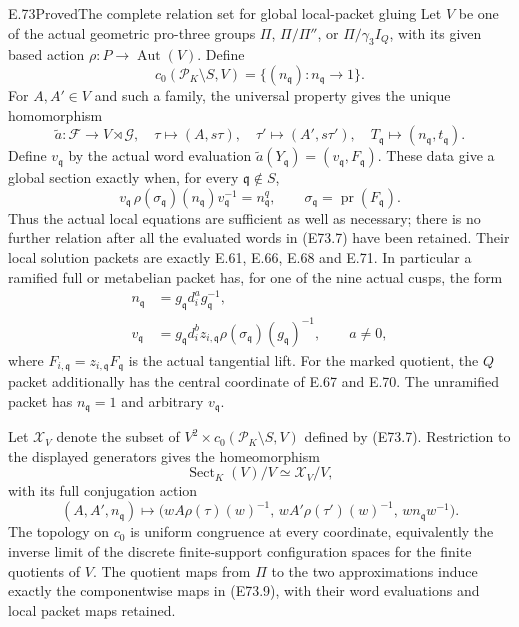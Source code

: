 \begin{statement}{E.73}{Proved}{The complete relation set for global local-packet gluing}
Let $V$ be one of the actual geometric pro-three groups
$\Pi$, $\Pi/\Pi''$, or $\Pi/\gamma_3 I_Q$, with its given
based action $\rho:P\to\operatorname{Aut}(V)$. Define
\[
 c_0(\mathcal P_K\setminus S,V)
   =\{(n_{\mathfrak q}): n_{\mathfrak q}\to1\}.
 \tag{E73.5}
\]
For $A,A'\in V$ and such a family, the universal property
gives the unique homomorphism
\[
 \widetilde a:\mathcal F\longrightarrow V\rtimes\mathcal G,
 \quad
 \tau\mapsto(A,s\tau),\quad
 \tau'\mapsto(A',s\tau'),\quad
 T_{\mathfrak q}\mapsto(n_{\mathfrak q},t_{\mathfrak q}).
 \tag{E73.6}
\]
Define $v_{\mathfrak q}$ by the actual word evaluation
$\widetilde a(Y_{\mathfrak q})=(v_{\mathfrak q},F_{\mathfrak q})$.
These data give a global section exactly when, for every
$\mathfrak q\notin S$,
\[
 v_{\mathfrak q}\,
     \rho(\sigma_{\mathfrak q})(n_{\mathfrak q})
         v_{\mathfrak q}^{-1}=n_{\mathfrak q}^{q},
 \qquad \sigma_{\mathfrak q}=\operatorname{pr}(F_{\mathfrak q}).
 \tag{E73.7}
\]
Thus the actual local equations are sufficient as well
as necessary; there is no further relation after all
the evaluated words in (E73.7) have been retained.
Their local solution packets are exactly E.61, E.66,
E.68 and E.71. In particular a ramified full or
metabelian packet has, for one of the nine actual
cusps, the form
\[
 \begin{split}
 n_{\mathfrak q}&=g_{\mathfrak q}d_i^a g_{\mathfrak q}^{-1},\\
 v_{\mathfrak q}&=
    g_{\mathfrak q}d_i^b z_{i,\mathfrak q}
       \rho(\sigma_{\mathfrak q})(g_{\mathfrak q})^{-1},
       \qquad a\ne0,
 \end{split}
 \tag{E73.8}
\]
where $F_{i,\mathfrak q}=z_{i,\mathfrak q}F_{\mathfrak q}$
is the actual tangential lift. For the marked quotient,
the $Q$ packet additionally has the central coordinate
of E.67 and E.70. The unramified packet has
$n_{\mathfrak q}=1$ and arbitrary $v_{\mathfrak q}$.

Let $\mathcal X_V$ denote the subset of
$V^2\times c_0(\mathcal P_K\setminus S,V)$ defined by
(E73.7). Restriction to the displayed generators gives
the homeomorphism
\[
 \operatorname{Sect}_K(V)/V\simeq\mathcal X_V/V,
 \tag{E73.9}
\]
with its full conjugation action
\[
 (A,A',n_{\mathfrak q})\longmapsto
 \bigl(wA\rho(\tau)(w)^{-1},\,
       wA'\rho(\tau')(w)^{-1},\,
       wn_{\mathfrak q}w^{-1}\bigr).
 \tag{E73.10}
\]
The topology on $c_0$ is uniform congruence at every
coordinate, equivalently the inverse limit of the
discrete finite-support configuration spaces for
the finite quotients of $V$. The quotient maps from
$\Pi$ to the two approximations induce exactly the
componentwise maps in (E73.9), with their word evaluations
and local packet maps retained.


\end{statement}
